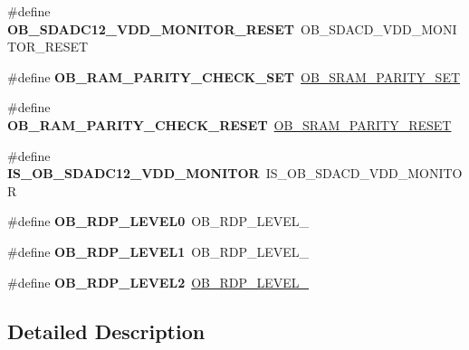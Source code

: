 \begin{DoxyCompactItemize}
\mbox{\label{group___h_a_l___f_l_a_s_h___aliased___defines_ga330d35b134c5a576318103b718559b11}} 
\#define {\bfseries O\+B\+\_\+\+S\+D\+A\+D\+C12\+\_\+\+V\+D\+D\+\_\+\+M\+O\+N\+I\+T\+O\+R\+\_\+\+R\+E\+S\+ET}~O\+B\+\_\+\+S\+D\+A\+C\+D\+\_\+\+V\+D\+D\+\_\+\+M\+O\+N\+I\+T\+O\+R\+\_\+\+R\+E\+S\+ET
\item 
\mbox{\label{group___h_a_l___f_l_a_s_h___aliased___defines_ga98952cd374b07146bb79583fd61ef6e6}} 
\#define {\bfseries O\+B\+\_\+\+R\+A\+M\+\_\+\+P\+A\+R\+I\+T\+Y\+\_\+\+C\+H\+E\+C\+K\+\_\+\+S\+ET}~\hyperlink{group___f_l_a_s_h_ex___o_b___r_a_m___parity___check___enable_gab108dcd65836f802216f11c238450cd6}{O\+B\+\_\+\+S\+R\+A\+M\+\_\+\+P\+A\+R\+I\+T\+Y\+\_\+\+S\+ET}
\item 
\mbox{\label{group___h_a_l___f_l_a_s_h___aliased___defines_gab425a7c5a822ef819107a93463361bd9}} 
\#define {\bfseries O\+B\+\_\+\+R\+A\+M\+\_\+\+P\+A\+R\+I\+T\+Y\+\_\+\+C\+H\+E\+C\+K\+\_\+\+R\+E\+S\+ET}~\hyperlink{group___f_l_a_s_h_ex___o_b___r_a_m___parity___check___enable_gab408447c5e7a9bd087e9346cc3b3021b}{O\+B\+\_\+\+S\+R\+A\+M\+\_\+\+P\+A\+R\+I\+T\+Y\+\_\+\+R\+E\+S\+ET}
\item 
\mbox{\label{group___h_a_l___f_l_a_s_h___aliased___defines_gafc1560626d243a2c9fbd72dbb65c8941}} 
\#define {\bfseries I\+S\+\_\+\+O\+B\+\_\+\+S\+D\+A\+D\+C12\+\_\+\+V\+D\+D\+\_\+\+M\+O\+N\+I\+T\+OR}~I\+S\+\_\+\+O\+B\+\_\+\+S\+D\+A\+C\+D\+\_\+\+V\+D\+D\+\_\+\+M\+O\+N\+I\+T\+OR
\item 
\mbox{\label{group___h_a_l___f_l_a_s_h___aliased___defines_ga7339a05119a474a7bde67e9e500d38cb}} 
\#define {\bfseries O\+B\+\_\+\+R\+D\+P\+\_\+\+L\+E\+V\+E\+L0}~O\+B\+\_\+\+R\+D\+P\+\_\+\+L\+E\+V\+E\+L\+\_
\item 
\mbox{\label{group___h_a_l___f_l_a_s_h___aliased___defines_ga7291ec039ae68ee1471af8ef3310d326}} 
\#define {\bfseries O\+B\+\_\+\+R\+D\+P\+\_\+\+L\+E\+V\+E\+L1}~O\+B\+\_\+\+R\+D\+P\+\_\+\+L\+E\+V\+E\+L\+\_
\item 
\mbox{\label{group___h_a_l___f_l_a_s_h___aliased___defines_gae591fa55ccad5cc27b322a5fba9d6ca1}} 
\#define {\bfseries O\+B\+\_\+\+R\+D\+P\+\_\+\+L\+E\+V\+E\+L2}~\hyperlink{group___f_l_a_s_h_ex___o_b___read___protection_ga2262afca565429ce2808d835c49e5ee6}{O\+B\+\_\+\+R\+D\+P\+\_\+\+L\+E\+V\+E\+L\+\_}
\end{DoxyCompactItemize}


\subsection{Detailed Description}
